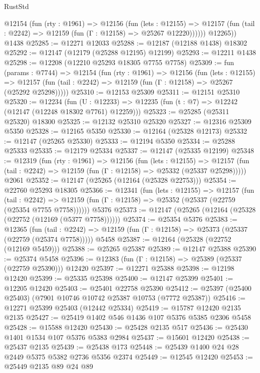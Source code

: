 \begin{lexlean}{RustStd}
\begin{coremodule}
          @12154
            (fun (rty : @1961) =>
            @12156
              (fun (lets : @12155) =>
              @12157 (fun (tail : @2242) => @12159 (fun (Γ : @12158) => @25267 @12220))))))
        @12265))
    @1438
@25285 := @12271 @12033
@25288 := @12187 (@12188 @1438) @18302
@25292 := @12147 (@12179 (@25288 @12195) @12199)
@25293 := @12211 @1438
@25298 := @12208 (@12210 @25293 @18305 @7755 @7758)
@25309 := fun (params : @7744) =>
  @12154
    (fun (rty : @1961) =>
    @12156
      (fun (lets : @12155) =>
      @12157 (fun (tail : @2242) => @12159 (fun (Γ : @12158) => @25267 (@25292 @25298)))))
@25310 := @12153 @25309
@25311 := @12151 @25310
@25320 := @12234
    (fun (U : @12233) => @12235 (fun (t : @7) => @12242 (@12147 (@12248 @18302 @7761) @12259)))
@25323 := @25285 (@25311 @25320) @18300
@25325 := @12132 @25310 @25320
@25327 := @12316 @25309 @5350
@25328 := @12165 @5350
@25330 := @12164 (@25328 @12173)
@25332 := @12147 (@25265 @25330)
@25333 := @12194 @5350
@25334 := @25288 @25333
@25335 := @12179 @25334
@25337 := @12147 (@25335 @12199)
@25348 := @12319
    (fun (rty : @1961) =>
    @12156
      (fun (lets : @12155) =>
      @12157 (fun (tail : @2242) => @12159 (fun (Γ : @12158) => @25332 (@25337 @25298)))))
    @2061
@25352 := @12147 (@25265 (@12164 (@25328 @22753)))
@25354 := @22760 @25293 @18305
@25366 := @12341
    (fun (lets : @12155) =>
    @12157
      (fun (tail : @2242) =>
      @12159 (fun (Γ : @12158) => @25352 (@25337 (@22759 (@25354 @7755 @7758))))))
    @5376
@25373 := @12147 (@25265 (@12164 (@25328 (@22752 (@12169 (@5377 @7758))))))
@25374 := @25354 @5376
@25383 := @12365
    (fun (tail : @2242) => @12159 (fun (Γ : @12158) => @25373 (@25337 (@22759 (@25374 @7758)))))
    @5458
@25387 := @12164 (@25328 (@22752 (@12169 @5459)))
@25388 := @25265 @25387
@25389 := @12147 @25388
@25390 := @25374 @5458
@25396 := @12383 (fun (Γ : @12158) => @25389 (@25337 (@22759 @25390))) @12420
@25397 := @12271 @25388
@25398 := @12198 @12420
@25399 := @25335 @25398
@25400 := @12147 @25399
@25401 := @12205 @12420
@25403 := @25401 @22758 @25390
@25412 := @25397 (@25400 @25403) (@7901 @10746 @10742 @25387 @10753 (@7772 @25387))
@25416 := @12271 @25399 @25403 (@12442 @25334)
@25419 := @15787 @12420 @2135 @2135
@25427 := @25419 @1402 @546 @1436 @107 @5376 @5385 @2306 @5458
@25428 := @15588 @12420
@25430 := @25428 @2135 @517
@25436 := @25430 @1401 @1534 @107 @5376 @5383 @2984
@25437 := @15601 @12420
@25438 := @25437 @2135
@25439 := @25438 @173
@25448 := @25439 @1400 @24 @28 @2449 @5375 @5382 @2736 @5356 @2374
@25449 := @12545 @12420
@25453 := @25449 @2135 @89 @24 @89

\end{coremodule}
\end{lexlean}
